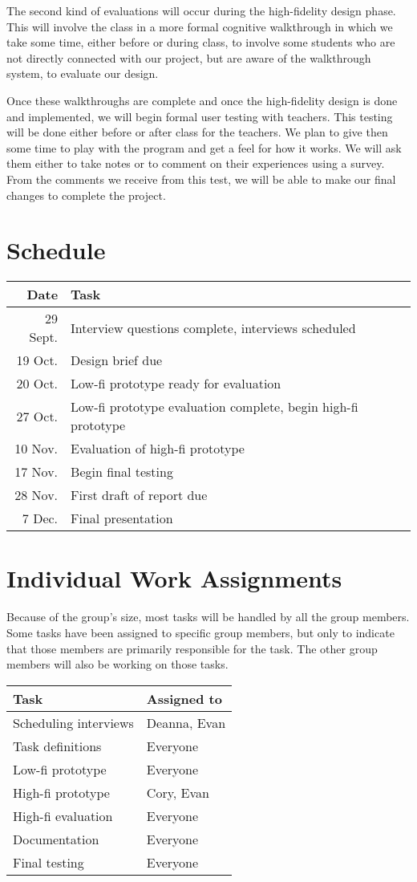 \documentclass[11pt,letter]{article}
\begin{document}
The second kind of evaluations will occur during the high-fidelity design phase.
This will involve the class in a more formal cognitive walkthrough in which
we take some time, either before or during class, to involve some students who
are not directly connected with our project, but are aware of the walkthrough
system, to evaluate our design.

Once these walkthroughs are complete and once the high-fidelity design is
done and implemented, we will begin formal user testing with teachers.  This
testing will be done either before or after class for the teachers.  We plan
to give then some time to play with the program and get a feel for how it works.
We will ask them either to take notes or to comment on their experiences using
a survey.  From the comments we receive from this test, we will be able to
make our final changes to complete the project.

\section{Schedule}
\begin{tabular}[!h]{rl}
	\textbf{Date} & \textbf{Task} \\
	\hline
	29 Sept. & Interview questions complete, interviews scheduled \\
	19 Oct.  & Design brief due \\
	20 Oct.  & Low-fi prototype ready for evaluation \\
	27 Oct.  & Low-fi prototype evaluation complete, begin high-fi prototype \\
	10 Nov.  & Evaluation of high-fi prototype \\
	17 Nov.  & Begin final testing \\
	28 Nov.  & First draft of report due \\
	7 Dec.   & Final presentation
\end{tabular}

\section{Individual Work Assignments}
Because of the group's size, most tasks will be handled by all the group
members. Some tasks have been assigned to specific group members, but only to
indicate that those members are primarily responsible for the task. The other
group members will also be working on those tasks.

\hfill
\linebreak
\begin{tabular}[!h]{ll}
	\textbf{Task}         & \textbf{Assigned to} \\
	\hline
	Scheduling interviews & Deanna, Evan \\
	Task definitions      & Everyone \\
	Low-fi prototype      & Everyone \\
	High-fi prototype     & Cory, Evan \\
	High-fi evaluation    & Everyone \\
	Documentation         & Everyone \\
	Final testing         & Everyone
\end{tabular}
\end{document}

